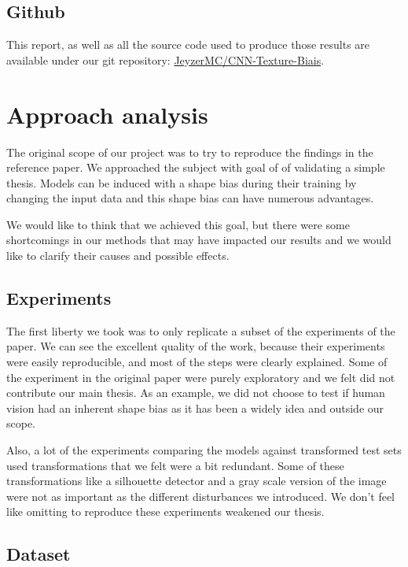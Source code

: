 \documentclass{article}
\begin{document}
\subsection{Github}

This report, as well as all the source code used to produce those results are available 
under our git repository: 
\hyperlink{https://github.com/JeyzerMC/CNN-Texture-Bias}{JeyzerMC/CNN-Texture-Biais}.

\newpage
\section{Approach analysis}

The original scope of our project was to try to reproduce the findings in the reference paper.
We approached the subject with goal of of validating a simple thesis. 
Models can be induced with a shape bias during their training by changing the input data and 
this shape bias can have numerous advantages.\medskip \par

\noindent
We would like to think that we achieved this goal, but there were some shortcomings in our methods that may have impacted our results and we would like to clarify their causes and possible effects.

\subsection{Experiments}

The first liberty we took was to only replicate a subset of the experiments of the paper.
We can see the excellent quality of the work, 
because their experiments were easily reproducible, and most of the 
steps were clearly explained.
Some of the experiment in the original paper were purely exploratory and 
we felt did not contribute our main thesis. 
As an example, we did not choose to test if human vision had an inherent shape bias as 
it has been a widely idea and outside our scope. \medskip \par

\noindent
Also, a lot of the experiments comparing the models against transformed test sets used transformations that we felt were a bit redundant. Some of these transformations like a silhouette detector and a gray scale version of the image were not as important as the different disturbances we introduced.
We don't feel like omitting to reproduce these experiments weakened our thesis.

\subsection{Dataset}
\end{document}
